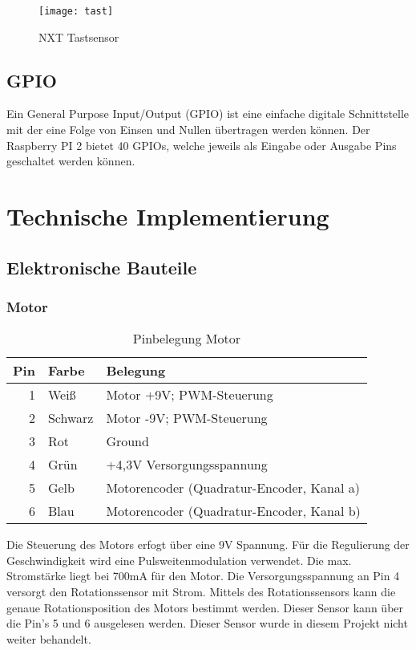 \begin{figure}[h]
  \centering
  \texttt{[image: tast]}
  \caption{NXT Tastsensor}
  \label{Kap1:tast}
\end{figure}

\section{GPIO}
Ein General Purpose Input/Output (GPIO) ist eine einfache digitale Schnittstelle mit der eine Folge von Einsen und Nullen übertragen werden können.
Der Raspberry PI 2 bietet 40 GPIOs, welche jeweils als Eingabe oder Ausgabe Pins geschaltet werden können.

\chapter{Technische Implementierung}

\section{Elektronische Bauteile}

\subsection{Motor}\label{eb:motor}

\begin{table}[!ht]
\centering
\rmfamily
\caption{Pinbelegung Motor}
\renewcommand{\arraystretch}{1.1}
\sffamily
\begin{footnotesize}
\begin{tabular}{r | l l}
\toprule
\textbf{Pin} & \textbf{Farbe}  & \textbf{Belegung}\\
\midrule
1 & Weiß & Motor +9V; PWM-Steuerung \\
2 & Schwarz & Motor -9V; PWM-Steuerung \\
3 & Rot & Ground \\
4 & Grün & +4,3V Versorgungsspannung \\
5 & Gelb & Motorencoder (Quadratur-Encoder, Kanal a) \\
6 & Blau & Motorencoder (Quadratur-Encoder, Kanal b) \\
\bottomrule
\end{tabular}
\end{footnotesize}
\label{eb:motor:tbl}
\end{table}

Die Steuerung des Motors erfogt über eine 9V Spannung. Für die Regulierung der Geschwindigkeit wird eine Pulsweitenmodulation verwendet. Die max. Stromstärke liegt bei 700mA für den Motor.  Die Versorgungsspannung an Pin 4 versorgt den Rotationssensor mit Strom. Mittels des Rotationssensors kann die genaue Rotationsposition des Motors bestimmt werden. Dieser Sensor kann über die Pin's 5 und 6 ausgelesen werden. Dieser Sensor wurde in diesem Projekt nicht weiter behandelt.


